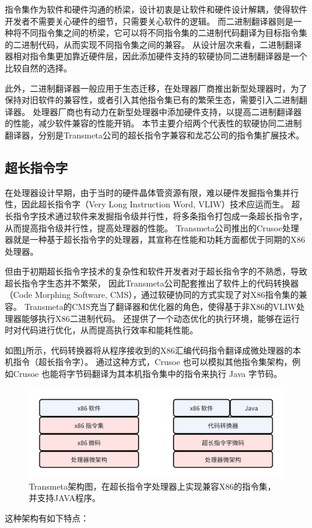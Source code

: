 指令集作为软件和硬件沟通的桥梁，设计初衷是让软件和硬件设计解耦，使得软件开发者不需要关心硬件的细节，只需要关心软件的逻辑。
而二进制翻译器则是一种将不同指令集之间的桥梁，它可以将不同指令集的二进制代码翻译为目标指令集的二进制代码，从而实现不同指令集之间的兼容。
从设计层次来看，二进制翻译器相对指令集更加靠近硬件层，因此添加硬件支持的软硬协同二进制翻译器是一个比较自然的选择。

此外，二进制翻译器一般应用于生态迁移，在处理器厂商推出新型处理器时，为了保持对旧软件的兼容性，或者引入其他指令集已有的繁荣生态，需要引入二进制翻译器。
处理器厂商也有动力在新型处理器中添加硬件支持，以提高二进制翻译器的性能，减少软件兼容的性能开销。
本节主要介绍两个代表性的软硬协同二进制翻译器，分别是Transmeta公司的超长指令字兼容和龙芯公司的指令集扩展技术。

\subsection{超长指令字}

在处理器设计早期，由于当时的硬件晶体管资源有限，难以硬件发掘指令集并行性，因此超长指令字（Very Long Instruction Word, VLIW）技术应运而生。
超长指令字技术通过软件来发掘指令级并行性，将多条指令打包成一条超长指令字，从而提高指令级并行性，提高处理器的性能。
Transmeta公司推出的Crusoe处理器就是一种基于超长指令字的处理器，其宣称在性能和功耗方面都优于同期的X86处理器\cite{dehnertTransmetaCodeMorphing2003}。

但由于初期超长指令字技术的复杂性和软件开发者对于超长指令字的不熟悉，导致超长指令字生态并不繁荣，
因此Transmeta公司配套推出了软件上的代码转换器（Code Morphing Software, CMS），通过软硬协同的方式实现了对X86指令集的兼容。
Transmeta的CMS充当了翻译器和优化器的角色，使得基于非X86的VLIW处理器能够执行X86二进制代码。
还提供了一个动态优化的执行环境，能够在运行时对代码进行优化，从而提高执行效率和能耗性能\cite{dehnertTransmetaCodeMorphing2003}。

如图\ref{img:transmeta_arch}所示，代码转换器将从程序接收到的X86汇编代码指令翻译成微处理器的本机指令（超长指令字）。
通过这种方式，Crusoe 也可以模拟其他指令集架构，例如Crusoe 也能将字节码翻译为其本机指令集中的指令来执行 Java 字节码。

\begin{figure}[!htbp]
    \centering
    \includegraphics[width=0.8\linewidth]{./feishuImage/transmeta_arch.png}
    \caption{Transmeta架构图，在超长指令字处理器上实现兼容X86的指令集，并支持JAVA程序。}
    \label{img:transmeta_arch}
  \end{figure}
这种架构有如下特点：

